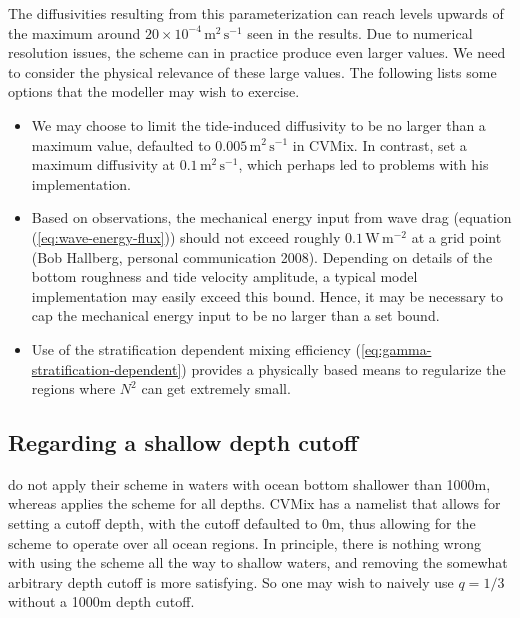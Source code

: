The diffusivities resulting from this parameterization can reach
levels upwards of the maximum around $20 \times 10^{-4} \,
\mbox{m}^{2} \, \mbox{s}^{-1}$ seen in the \cite{Polzinetal97}
results.  Due to numerical resolution issues, the scheme can in
practice produce even larger values.  We need to consider the physical
relevance of these large values.  The following lists some options
that the modeller may wish to exercise.

\begin{itemize}

\item We may choose to limit the tide-induced diffusivity to be no
  larger than a maximum value, defaulted to $0.005 \, \mbox{m}^{2} \,
  \mbox{s}^{-1}$ in CVMix.  In contrast, \cite{Jayne2009} set a
  maximum diffusivity at $0.1 \, \mbox{m}^{2} \, \mbox{s}^{-1}$, which
  perhaps led to problems with his implementation.

\item Based on observations, the mechanical energy input from wave
  drag (equation (\ref{eq:wave-energy-flux})) should not exceed
  roughly $0.1 \, \mbox{W} \, \mbox{m}^{-2}$ at a grid point (Bob
  Hallberg, personal communication 2008).  Depending on details of the
  bottom roughness and tide velocity amplitude, a typical model
  implementation may easily exceed this bound.  Hence, it may be
  necessary to cap the mechanical energy input to be no larger than a
  set bound.

\item Use of the stratification dependent mixing efficiency
  (\ref{eq:gamma-stratification-dependent}) provides a physically
  based means to regularize the regions where $N^{2}$ can get
  extremely small. 

\end{itemize}


\subsection{Regarding a shallow depth cutoff}

\cite{Simmonsetal2004} do not apply their scheme in waters with ocean
bottom shallower than 1000m, whereas \cite{Jayne2009} applies the
scheme for all depths.  CVMix has a namelist that allows for setting a
cutoff depth, with the cutoff defaulted to 0m, thus allowing for the
scheme to operate over all ocean regions.  In principle, there is
nothing wrong with using the \cite{Simmonsetal2004} scheme all the way
to shallow waters, and removing the somewhat arbitrary depth cutoff is
more satisfying.  So one may wish to naively use $q = 1/3$ without a
1000m depth cutoff.

